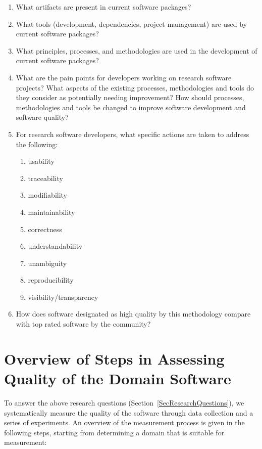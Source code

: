 \documentclass[letterpaper,cleveref]{lipics-v2019}
\begin{document}
\begin{enumerate}
\item What artifacts are present in current software packages? 
\item What tools (development, dependencies, project management) are used by
current software packages?
\item What principles, processes, and methodologies are used in the development
  of current software packages?
\item What are the pain points for developers working on research software
  projects?  What aspects of the existing processes, methodologies and tools do
  they consider as potentially needing improvement?  How should processes,
  methodologies and tools be changed to improve software development and
  software quality?
\item For research software developers, what specific actions are taken to
  address the following:
\begin{enumerate}
\item usability
\item traceability
\item modifiability
\item maintainability
\item correctness
\item understandability
\item unambiguity
\item reproducibility
\item visibility/transparency
\end{enumerate} 
\item How does software designated as high quality by this methodology compare
  with top rated software by the community?
\end{enumerate}

\section{Overview of Steps in Assessing Quality of the Domain Software}
\label{StepsAQDS}

To answer the above research questions (Section~\ref{SecResearchQuestions}), we
systematically measure the quality of the software through data collection and a
series of experiments.  An overview of the measurement process is given in the
following steps, starting from determining a domain that is suitable for
measurement:
\end{document}
